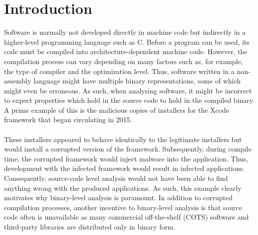\documentclass{kththesis}
\newcommand{\fbcomment}[1]{{#1}}
\renewcommand{\fbcomment}[1]{}
\begin{document}
\listoffigures
\thispagestyle{empty}
 
\listoftables
\thispagestyle{empty}

\mainmatter
\cleardoublepage
{}


\chapter{Introduction}
%
\fbcomment{\color{red}Goal: Introduce the reader to why the topic is relevant, what the problem statement is and the outline of the thesis}
Software is normally not developed directly in machine code but indirectly in a higher-level programming language such as C. Before a program can be used, its code must be compiled into architecture-dependent machine code. However, the compilation process can vary depending on many factors such as, for example, the type of compiler and the optimization level. Thus, software written in a non-assembly language might have multiple binary representations, some of which might even be erroneous\cite{preciseCFG}. As such, when analysing software, it might be incorrect to expect properties which hold in the source code to hold in the compiled binary. A prime example of this is the malicious copies of installers for the Xcode\cite{XcodeBook} framework that began circulating in 2015\cite{XcodeGhost}.
\\ \\ 
These installers appeared to behave identically to the legitimate installers but would install a corrupted version of the framework. Subsequently, during compile time, the corrupted framework would inject malware into the application. Thus, development with the infected framework would result in infected applications. Consequently, source-code level analysis would not have been able to find anything wrong with the produced applications. As such, this example clearly motivates why binary-level analysis is paramount. In addition to corrupted compilation processes, another incentive to binary-level analysis is that source code often is unavailable as many commercial off-the-shelf (COTS) software and third-party libraries are distributed only in binary form\cite{preciseCFG}.
\end{document}

